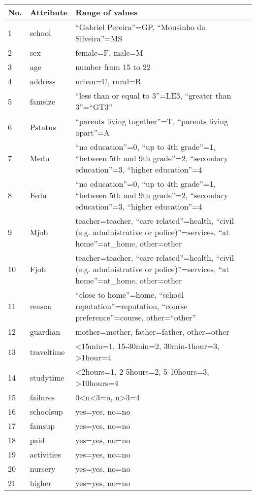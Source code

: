 \begin{table}
\center
{}
\begin{tabular} {m{1em} m{1.5cm} m{9cm}} 
 \hline
 No. & Attribute & Range of values \\
 \hline
 1 & school & ``Gabriel Pereira''=GP, ``Mousinho da Silveira''=MS \\ 
 2 & sex & female=F, male=M \\ 
 3 & age & number from 15 to 22 \\
 4 & address & urban=U, rural=R \\
 5 & famsize & ``less than or equal to 3''=LE3, ``greater than 3''=``GT3'' \\
 6 & Pstatus & ``parents living together''=T, ``parents living apart''=A \\
 7 & Medu & ``no education''=0, ``up to 4th grade''=1, ``between 5th and 9th grade''=2, ``secondary education''=3, ``higher education''=4 \\
 8 & Fedu & ``no education''=0, ``up to 4th grade''=1, ``between 5th and 9th grade''=2, ``secondary education''=3, ``higher education''=4 \\
 9 & Mjob & teacher=teacher, ``care related''=health, ``civil (e.g. administrative or police)''=services, ``at home''=at\_home, other=other \\
 10 & Fjob & teacher=teacher, ``care related''=health, ``civil (e.g. administrative or police)''=services, ``at home''=at\_home, other=other \\
 11 & reason & ``close to home''=home, ``school reputation''=reputation, ``course preference''=course, other=``other'' \\
 12 & guardian & mother=mother, father=father, other=other \\
 13 & traveltime & \textless15min=1, 15-30min=2, 30min-1hour=3, \textgreater1hour=4 \\
 14 & studytime & \textless2hours=1, 2-5hours=2, 5-10hours=3, \textgreater10hours=4 \\
 15 & failures & 0\textless n\textless3=n, n\textgreater3=4 \\
16 & schoolsup & yes=yes, no=no \\
17 & famsup & yes=yes, no=no \\
18 & paid & yes=yes, no=no \\
19 & activities & yes=yes, no=no \\
20 & nursery & yes=yes, no=no \\
21 & higher & yes=yes, no=no \\

\end{tabular}
\end{table}
